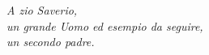 
\cleardoublepage
\thispagestyle{empty}
\begin{flushleft}
\itshape A zio Saverio,\\
un grande Uomo ed esempio da seguire,\\
un secondo padre.
\end{flushleft}
\cleardoublepage

\restoregeometry
